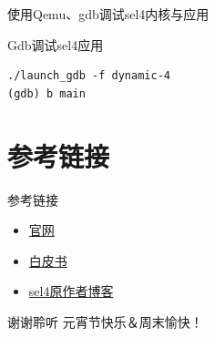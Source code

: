 \documentclass[presentation,dvipdfmx,CJKbookmarks]{beamer}
\begin{document}
\begin{CJK*}{UTF8}{simsun}
\begin{frame}[label={sec:orgcf654ce},fragile]{使用\thinspace Qemu、gdb\thinspace 调试\thinspace sel4\thinspace 内核与应用}
\begin{block}{Gdb\thinspace 调试\thinspace sel4\thinspace 应用}
\begin{verbatim}
./launch_gdb -f dynamic-4
(gdb) b main
\end{verbatim}
\end{block}
\end{frame}

\section{参考链接}
\label{sec:orga059d9d}
\begin{frame}[label={sec:org3b276f7}]{参考链接}
\begin{itemize}
\item \href{https://docs.sel4.systems/projects/sel4/api-doc.html}{官网}
\item \href{https://sel4.systems/About/seL4-whitepaper.pdf}{白皮书}
\item \href{https://microkerneldude.wordpress.com/2020/04/07/the-sel4-foundation-what-and-why/}{sel4\thinspace 原作者博客}
\end{itemize}
\end{frame}

\begin{frame}[label={sec:org359e13e}]{谢谢聆听}
元宵节快乐＆周末愉快！
\end{frame}
\end{CJK*}
\end{document}
